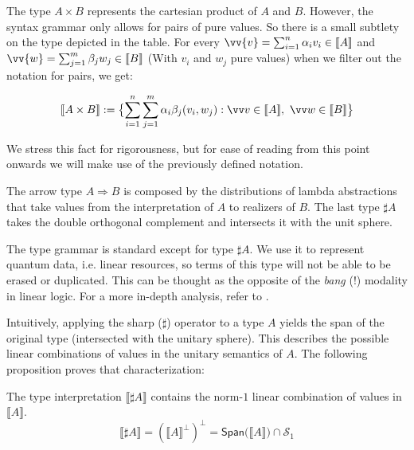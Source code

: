 \documentclass[runningheads,orivec,envcountsame,envcountsect]{llncs}
\newcommand\Span[1]{\ensuremath{{\mathsf{Span}}{#1}}}
\def\Sph{\mathcal{S}_1}       %
\def\Arr{\Rightarrow}
\def\sem#1{\llbracket#1\rrbracket}
\begin{document}
The type $A\times B$ represents the cartesian product of $A$ and $B$. However, the syntax grammar only allows for pairs of pure values. So there is a small subtlety on the type depicted in the table. For every $\vv{v}=\sum_{i=1}^{n}\alpha_i v_i\in\sem{A}$ and $\vv{w}=\sum_{j=1}^{m}\beta_j w_j\in\sem{B}$ (With $v_i$ and $w_j$ pure values) when we filter out the notation for pairs, we get:

\[
  \sem{A\times B}:= \bigl\{ \sum_{i=1}^{n}\sum_{j=1}^{m}\alpha_i\beta_j(v_i, w_j): \vv v \in{\sem{A}},~\vv w\in\sem{B}\bigr\}
\]

We stress this fact for rigorousness, but for ease of reading from this point onwards we will make use of the previously defined notation.

The arrow type $A\Arr B$ is composed by the distributions of lambda abstractions that take values from the interpretation of $A$ to realizers of $B$. The last type $\sharp A$ takes the double orthogonal complement and intersects it with the unit sphere. 

The type grammar is standard except for type $\sharp A$. We use it to represent quantum data, i.e. linear resources, so terms of this type will not be able to be erased or duplicated. This can be thought as the opposite of the \textit{bang} ($!$) modality in linear logic. For a more in-depth analysis, refer to \cite{DiazcaroCIE2025}.

Intuitively, applying the sharp ($\sharp$) operator to a type $A$ yields the span of the original type (intersected with the unitary sphere). This describes the possible linear combinations of values in the unitary semantics of $A$. The following proposition proves that characterization:

\begin{theorem}\label{prop:SharpCharacterization}
  The type interpretation $\sem{\sharp A}$ contains the norm-$1$ linear combination of values in $\sem{A}$.
  \[
  \sem{\sharp A} = (\sem{A}^\bot)^\bot = \Span(\sem{A})\cap\Sph
  \]
\end{theorem}
\end{document}
